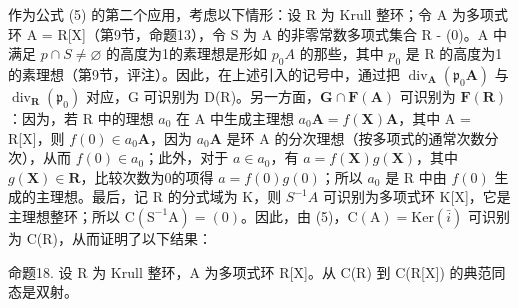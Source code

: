 作为公式 (5) 的第二个应用，考虑以下情形：设 R 为 Krull 整环；令 A 为多项式环 A = R{[}X{]}（第9节，命题13），令 S 为 A 的非零常数多项式集合 R - (0)。A 中满足 \(p \cap S \neq \varnothing\) 的高度为1的素理想是形如 \(p_{0}A\) 的那些，其中 \(p_{0}\) 是 R 的高度为1的素理想（第9节，评注）。因此，在上述引入的记号中，通过把 \(\operatorname{div}_{\mathbf{A}}(\mathfrak{p}_{0}\mathbf{A})\) 与 \(\operatorname{div}_{\mathbf{R}}(\mathfrak{p}_{0})\) 对应，G 可识别为 D(R)。另一方面，\(\mathbf{G} \cap \mathbf{F}(\mathbf{A})\) 可识别为 \(\mathbf{F}(\mathbf{R})\)：因为，若 R 中的理想 \(a_{0}\) 在 A 中生成主理想 \(a_{0}\mathbf{A} = f(\mathbf{X})\mathbf{A}\)，其中 A = R{[}X{]}，则 \(f(0) \in a_{0}\mathbf{A}\)，因为 \(a_{0}\mathbf{A}\) 是环 A 的分次理想（按多项式的通常次数分次），从而 \(f(0) \in a_{0}\)；此外，对于 \(a \in a_{0}\)，有 \(a = f(\mathbf{X})g(\mathbf{X})\)，其中 \(g(\mathbf{X}) \in \mathbf{R}\)，比较次数为0的项得 \(a = f(0)g(0)\)；所以 \(a_{0}\) 是 R 中由 \(f(0)\) 生成的主理想。最后，记 R 的分式域为 K，则 \(S^{-1}A\) 可识别为多项式环 K{[}X{]}，它是主理想整环；所以 \(\mathrm{C}(\mathrm{S}^{-1}\mathrm{A}) = (0)\)。因此，由 (5)，\(\mathrm{C}(\mathrm{A}) = \mathrm{Ker}(\bar{i})\) 可识别为 C(R)，从而证明了以下结果：

命题18. 设 R 为 Krull 整环，A 为多项式环 R{[}X{]}。从 C(R) 到 C(R{[}X{]}) 的典范同态是双射。

